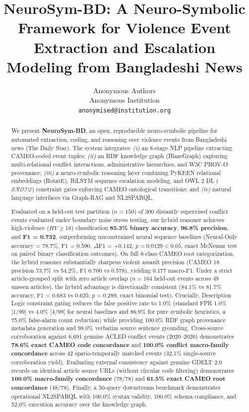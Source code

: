 \documentclass[11pt,a4paper]{article}
\title{
  \textbf{NeuroSym-BD: A Neuro-Symbolic Framework for Violence Event\\
  Extraction and Escalation Modeling from Bangladeshi News}
}
\author{
  Anonymous Authors\\
  Anonymous Institution\\
  \texttt{anonymised@institution.org}
}
\date{}
\begin{document}
\maketitle

\begin{abstract}
We present \textbf{NeuroSym-BD}, an open, reproducible neuro-symbolic pipeline for automated
extraction, coding, and reasoning over violence events from Bangladeshi
news (The Daily Star).
The system integrates:
\emph{(i)} an 8-stage NLP pipeline extracting CAMEO-coded event tuples;
\emph{(ii)} an RDF knowledge graph (BlazeGraph) capturing multi-relational conflict interactions,
  administrative hierarchies, and W3C PROV-O provenance;
\emph{(iii)} a neuro-symbolic reasoning layer combining PyKEEN relational embeddings (RotatE),
  BiLSTM sequence escalation modeling, and OWL 2 DL ($\mathcal{SROIQ}$) constraint gates
  enforcing CAMEO ontological transitions; and
\emph{(iv)} natural language interfaces via Graph-RAG and NL2SPARQL.

Evaluated on a held-out test partition ($n=150$) of 300 distantly supervised conflict events evaluated under boundary noise stress testing,
our hybrid reasoner achieves high-violence ($HV \ge 18$) classification \textbf{85.3\% binary accuracy}, \textbf{96.8\% precision}, and \textbf{F1 = 0.732},
outperforming unconstrained neural sequence baselines (Neural-Only accuracy = 78.7\%, F1 = 0.590, $\Delta$F1 = +0.142, $p = 0.0129 < 0.05$, exact McNemar test on paired binary classification outcomes).
On full 8-class CAMEO root categorization, the hybrid reasoner substantially sharpens violent assault precision (CAMEO 18 precision 73.7\% vs 54.2\%, F1 0.700 vs 0.578), yielding 0.177 macro-F1.
Under a strict article-grouped split with zero article overlap ($n=164$ held-out events across 49 unseen articles), the hybrid advantage is directionally consistent ($84.1\%$ vs $81.7\%$ accuracy, F1 = $0.683$ vs $0.625$; $p = 0.289$, exact binomial test).
Crucially, Description Logic constraint gating reduces the false positive rate to 1.0\% (standard FPR 1.0\% [1/99] vs 4.0\% [4/99] for neural baselines and 86.9\% for pure symbolic heuristics, a 75.0\% false-alarm count reduction) while providing 100.0\% RDF graph provenance metadata generation and 98.0\% verbatim source sentence grounding.
Cross-source corroboration against 6,691 genuine ACLED conflict events (2020--2026) demonstrates \textbf{78.6\% exact CAMEO code concordance} and \textbf{100.0\% conflict macro-family concordance} across 42 spatio-temporally matched events (32.1\% single-source corroboration yield).
Evaluating external consistency against genuine GDELT 2.0 records on identical article source URLs (without circular code filtering) demonstrates \textbf{100.0\% macro-family concordance} (78/78) and \textbf{61.5\% exact CAMEO root concordance} (48/78).
Finally, a 50-query downstream benchmark demonstrates operational NL2SPARQL with 100.0\% syntax validity, 100.0\% schema compliance, and 52.0\% execution accuracy over the knowledge graph.


\end{abstract}
\end{document}
